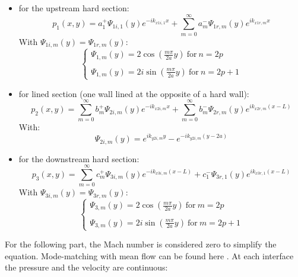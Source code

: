 \begin{itemize}
    \item for the upstream hard section:
    \begin{equation}
        p_1(x,y)=a_1^+ \Psi_{1i,1}(y)e^{-ik_{x1i,1}x}+\sum_{m=0}^\infty a_m^- \Psi_{1r,m}(y)e^{ik_{x1r,m}x}
    \end{equation}
    With $\Psi_{1i,m}(y)=\Psi_{1r,m}(y)$: 
    \begin{equation}
        \left\{
        \begin{array}{ll}
         \Psi_{1,m}(y)=2\cos(\frac{m\pi}{2a}y)\ \text{for} \ n=2p \\
        \\
        \Psi_{1,m}(y)=2i\sin(\frac{m\pi}{2a}y) \ \text{for} \ n=2p+1
       \end{array}
       \right.
    \end{equation}
    \item for lined section (one wall lined at the opposite of a hard wall):
    \begin{equation}
        p_2(x,y)=\sum_{m=0}^\infty b_m^+ \Psi_{2i,m}(y)e^{-ik_{x2i,m}x}+\sum_{m=0}^\infty b_m^- \Psi_{2r,m}(y)e^{ik_{x2r,m}(x-L)}
    \end{equation}
    With: 
    \begin{equation}
        \Psi_{2i,m}(y)=e^{ik_{y2i,m}y}-e^{-ik_{y2i,m}(y-2a)}
    \end{equation}
    \item for the downstream hard section:
    \begin{equation}
        p_3(x,y)=\sum_{m=0}^\infty c_m^+ \Psi_{3i,m}(y)e^{-ik_{x3i,m}(x-L)}+c_1^- \Psi_{3r,1}(y)e^{ik_{x3r,1}(x-L)}
    \end{equation}
    With $\Psi_{3i,m}(y)=\Psi_{3r,m}(y)$:   
    \begin{equation}
        \left\{
        \begin{array}{ll}
         \Psi_{3,m}(y)=2\cos(\frac{m\pi}{2a}y)\ \text{for} \ m=2p \\
        \\
        \Psi_{3,m}(y)=2i\sin(\frac{m\pi}{2a}y) \ \text{for} \ m=2p+1
       \end{array}
       \right.
    \end{equation}
\end{itemize}
For the following part, the Mach number is considered zero to simplify the equation. Mode-matching with mean flow can be found here \cite{ModematchM}.
At each interface the pressure and the velocity are continuous:
